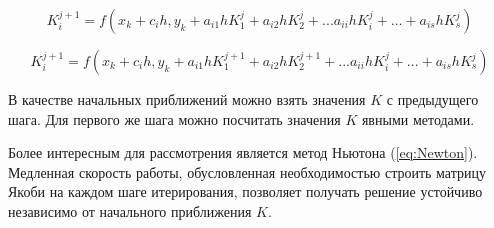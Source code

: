 
\begin{equation}
    K_i^{j + 1} = f(x_k + c_ih, y_k + a_{i1}hK_1^{j} + a_{i2}hK_2^{j} + ... a_{ii}hK_i^{j} + ... + a_{is}hK_s^{j})
    \label{eq:SI}
\end{equation}

\begin{equation}
    K_i^{j + 1} = f(x_k + c_ih, y_k + a_{i1}hK_1^{j + 1} + a_{i2}hK_2^{j + 1} + ... a_{ii}hK_i^{j} + ... + a_{is}hK_s^{j})
    \label{eq:Zeidel}
\end{equation}

В качестве начальных приближений можно взять значения $K$ с предыдущего шага. Для первого же шага можно посчитать значения $K$ явными
методами.

Более интересным для рассмотрения является метод Ньютона (\ref{eq:Newton}). Медленная скорость работы, обусловленная необходимостью строить матрицу Якоби
на каждом шаге итерирования, позволяет получать решение устойчиво независимо от начального приближения $K$.

